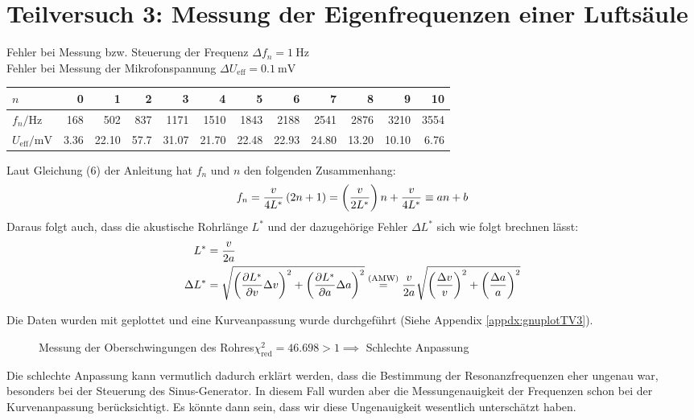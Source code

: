 \newpage
\section{Teilversuch 3: Messung der Eigenfrequenzen einer Luftsäule}
	Fehler bei Messung bzw. Steuerung der Frequenz $\Delta f_n = \SI{1}{\hertz}$\\
	Fehler bei Messung der Mikrofonspannung $\Delta U_\text{eff} = \SI{0.1}{\milli\volt}$

	\begin{center}
		\begin{tabular}{l *{11}{r}}
			\toprule
			$n$ & \num{0} & \num{1} & \num{2} & \num{3} & \num{4} & \num{5} & \num{6} & \num{7} & \num{8} & \num{9} & \num{10} \\
			\midrule
			$f_n / \si{\hertz}$ & \num{168} & \num{502} & \num{837} & \num{1171} & \num{1510} & \num{1843} & \num{2188} & \num{2541} & \num{2876} & \num{3210} & \num{3554} \\
			$U_\text{eff} / \si{\milli\volt}$ & \num{3.36} & \num{22.10} & \num{57.7} & \num{31.07} & \num{21.70} & \num{22.48} & \num{22.93} & \num{24.80} & \num{13.20} & \num{10.10} & \num{6.76} \\
			\bottomrule
		\end{tabular}
	\end{center}
	Laut Gleichung (6) der Anleitung hat $f_n$ und $n$ den folgenden Zusammenhang:
	\begin{equation}
		f_n = \frac{v}{4L^{*}} \left(2n +1\right) = \left(\frac{v}{2L^{*}}\right)n + \frac{v}{4L^{*}} \equiv an+b
	\end{equation}
	Daraus folgt auch, dass die akustische Rohrlänge $L^{*}$ und der dazugehörige Fehler $\Delta L^{*}$ sich wie folgt brechnen lässt:
	\begin{align}
		L^{*} &= \frac{v}{2a} \label{eqn:akustiklange}\\
		\Delta L^{*} &= \gausserror{L^{*}}{v,a} \overset{\text{\scriptsize (AMW)}}{=} \frac{v}{2a}\sqrt{\pbrace{\frac{\Delta v}{v}}^2 + \pbrace{\frac{\Delta a}{a}}^2} \label{eqn:deltaakustiklange}
	\end{align}

	Die Daten wurden mit \gnuplot{} geplottet und eine Kurveanpassung wurde durchgeführt (Siehe Appendix \ref{appdx:gnuplotTV3}).
	\begin{figure}[H]
		\centering
		
		\caption{\centering Messung der Oberschwingungen des Rohres\captionbr $\chi^2_{\text{red}} = \num{46.698} > 1 \implies$ Schlechte Anpassung}
		\label{fig:tvthree-plot}
		\vspace{-1em}
	\end{figure}
	Die schlechte Anpassung kann vermutlich dadurch erklärt werden, dass die Bestimmung der Resonanzfrequenzen eher ungenau war, besonders bei der Steuerung des Sinus-Generator. In diesem Fall wurden aber die Messungenauigkeit der Frequenzen schon bei der Kurvenanpassung berücksichtigt. Es könnte dann sein, dass wir diese Ungenauigkeit wesentlich unterschätzt haben. 

